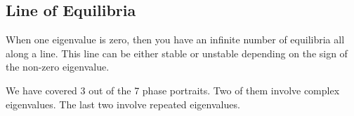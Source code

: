 \documentclass[10pt,letterpaper]{article}
\begin{document}

\subsection{Line of Equilibria}
When one eigenvalue is zero, then you have an infinite number of equilibria all along a line. This line can be either stable or unstable depending on the sign of the non-zero eigenvalue.

We have covered 3 out of the 7 phase portraits. Two of them involve complex eigenvalues. The last two involve repeated eigenvalues.
\end{document}
